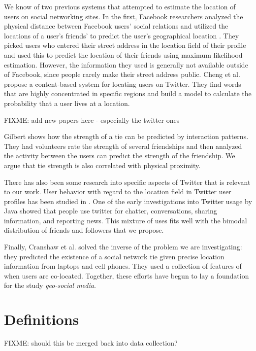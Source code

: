 We know of two previous systems that attempted to estimate the location of
users on social networking sites.  In the first, Facebook researchers analyzed
the physical distance between Facebook users' social relations and utilized the
locations of a user's friends' to predict the user's geographical location
\cite{backstrom2010find}.  They picked users who entered their street address
in the location field of their profile and used this to predict the location of
their friends using maximum likelihood estimation.  However, the information
they used is generally not available outside of Facebook, since people rarely
make their street address public.  Cheng et al. \cite{cheng2010you} propose a
content-based system for locating users on Twitter. They find words that are
highly concentrated in specific regions and build a model to calculate the
probability that a user lives at a location.

FIXME: add new papers here - especially the twitter ones

Gilbert \cite{gilbert2009predicting} shows how the strength of a tie can be
predicted by interaction patterns.  They had volunteers rate the strength of
several friendships and then analyzed the activity between the users can
predict the strength of the friendship.  We argue that tie strength is also
correlated with physical proximity.

There has also been some research into specific aspects of Twitter that is
relevant to our work.  User behavior with regard to the location field in
Twitter user profiles has been studied in \cite{hecht2011tweets}.  One of the
early investigations into Twitter usage by Java \cite{java2007we} showed that
people use twitter for chatter, conversations, sharing information, and
reporting news.  This mixture of uses fits well with the bimodal distribution
of friends and followers that we propose.

Finally, Cranshaw et al. \cite{cranshaw2010bridging} solved the inverse of the
problem we are investigating: they predicted the existence of a social network
tie given precise location information from laptops and cell phones. They used
a collection of features of when users are co-located.  Together, these efforts
have begun to lay a foundation for the study \textit{geo-social media}.

\section{Definitions}
FIXME: should this be merged back into data collection?

